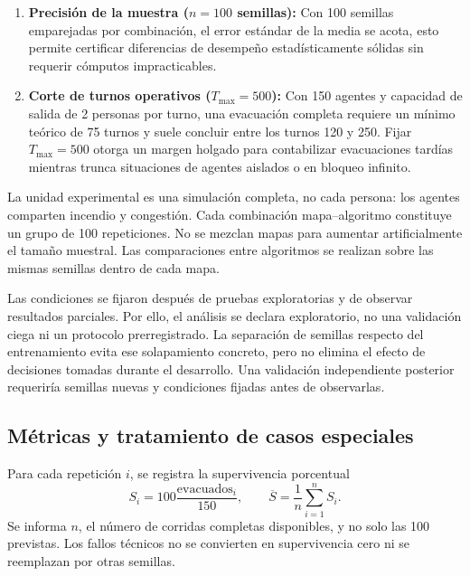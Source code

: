 \documentclass[11pt,letterpaper]{article}
\begin{document}
\begin{enumerate}
    \item \textbf{Precisión de la muestra ($n = 100$ semillas):}
    Con 100 semillas emparejadas por combinación, el error estándar de la media se acota, esto permite certificar diferencias de desempeño estadísticamente sólidas sin requerir cómputos impracticables.

    \item \textbf{Corte de turnos operativos ($T_{\max} = 500$):}
    Con 150 agentes y capacidad de salida de 2 personas por turno, una evacuación completa requiere un mínimo teórico de 75 turnos y suele concluir entre los turnos 120 y 250. Fijar $T_{\max} = 500$ otorga un margen holgado para contabilizar evacuaciones tardías mientras trunca situaciones de agentes aislados o en bloqueo infinito.
\end{enumerate}

La unidad experimental es una simulación completa, no cada persona: los agentes comparten incendio y congestión. Cada combinación mapa--algoritmo constituye un grupo de 100 repeticiones. No se mezclan mapas para aumentar artificialmente el tamaño muestral. Las comparaciones entre algoritmos se realizan sobre las mismas semillas dentro de cada mapa.

Las condiciones se fijaron después de pruebas exploratorias y de observar resultados parciales. Por ello, el análisis se declara exploratorio, no una validación ciega ni un protocolo prerregistrado. La separación de semillas respecto del entrenamiento evita ese solapamiento concreto, pero no elimina el efecto de decisiones tomadas durante el desarrollo. Una validación independiente posterior requeriría semillas nuevas y condiciones fijadas antes de observarlas.

\subsection{Métricas y tratamiento de casos especiales}
Para cada repetición $i$, se registra la supervivencia porcentual
\[
S_i=100\frac{\text{evacuados}_i}{150},
\qquad
\overline{S}=\frac{1}{n}\sum_{i=1}^{n}S_i.
\]
Se informa $n$, el número de corridas completas disponibles, y no solo las 100 previstas. Los fallos técnicos no se convierten en supervivencia cero ni se reemplazan por otras semillas.
\end{document}

